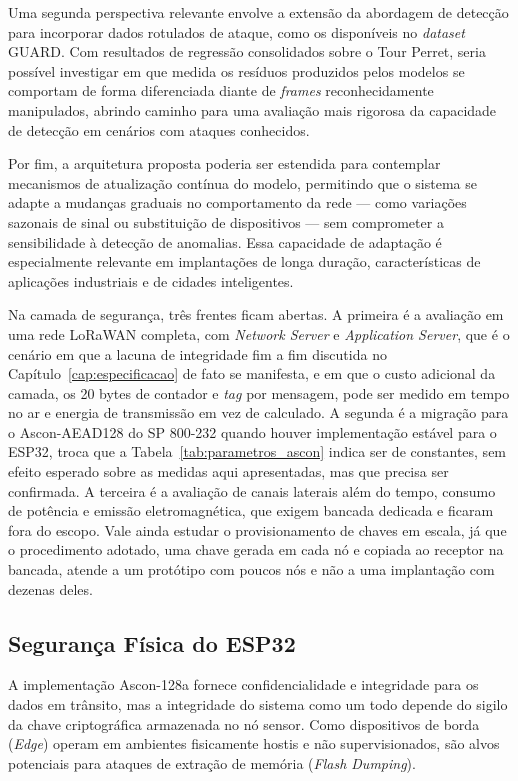 Uma segunda perspectiva relevante envolve a extensão da abordagem de 
detecção para incorporar dados rotulados de ataque, como os disponíveis no 
\textit{dataset} GUARD. Com resultados de regressão consolidados sobre o 
Tour Perret, seria possível investigar em que medida os resíduos produzidos 
pelos modelos se comportam de forma diferenciada diante de \textit{frames} 
reconhecidamente manipulados, abrindo caminho para uma avaliação mais 
rigorosa da capacidade de detecção em cenários com ataques conhecidos.

Por fim, a arquitetura proposta poderia ser estendida para contemplar 
mecanismos de atualização contínua do modelo, permitindo que o sistema se 
adapte a mudanças graduais no comportamento da rede — como variações 
sazonais de sinal ou substituição de dispositivos — sem comprometer a 
sensibilidade à detecção de anomalias. Essa capacidade de adaptação é 
especialmente relevante em implantações de longa duração, características 
de aplicações industriais e de cidades inteligentes.

Na camada de segurança, três frentes ficam abertas. A primeira é a avaliação em uma rede LoRaWAN completa, com \textit{Network Server} e \textit{Application Server}, que é o cenário em que a lacuna de integridade fim a fim discutida no Capítulo~\ref{cap:especificacao} de fato se manifesta, e em que o custo adicional da camada, os 20 bytes de contador e \textit{tag} por mensagem, pode ser medido em tempo no ar e energia de transmissão em vez de calculado. A segunda é a migração para o Ascon-AEAD128 do SP 800-232 quando houver implementação estável para o ESP32, troca que a Tabela~\ref{tab:parametros_ascon} indica ser de constantes, sem efeito esperado sobre as medidas aqui apresentadas, mas que precisa ser confirmada. A terceira é a avaliação de canais laterais além do tempo, consumo de potência e emissão eletromagnética, que exigem bancada dedicada e ficaram fora do escopo. Vale ainda estudar o provisionamento de chaves em escala, já que o procedimento adotado, uma chave gerada em cada nó e copiada ao receptor na bancada, atende a um protótipo com poucos nós e não a uma implantação com dezenas deles.


\subsection{Segurança Física do ESP32}
A implementação Ascon-128a fornece confidencialidade e integridade para os dados em trânsito, mas a integridade do sistema como um todo depende do sigilo da chave criptográfica armazenada no nó sensor. Como dispositivos de borda (\textit{Edge}) operam em ambientes fisicamente hostis e não supervisionados, são alvos potenciais para ataques de extração de memória (\textit{Flash Dumping}).

